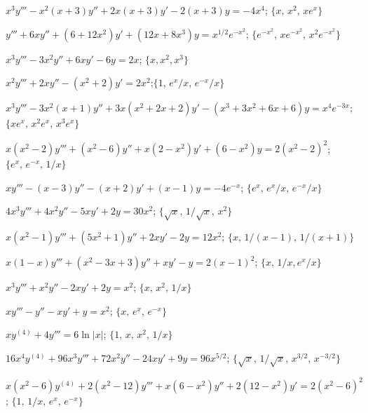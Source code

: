 \begin{exerciselist}
\item\label{exer:9.4.1}$x^3y'''-x^2(x+3)y''+2x(x+3)y'-2(x+3)y=-4x^4$;\quad
$\{x,\,x^2,\,xe^x\}$

\item\label{exer:9.4.2}$y'''+6xy''+(6+12x^2)y'+(12x+8x^3)y=x^{1/2}e^{-x^2}$;\quad
 $\{e^{-x^2},\,xe^{-x^2},\,x^2e^{-x^2}\}$

\item\label{exer:9.4.3}$x^3y'''-3x^2y''+6xy'-6y=2x$;
 \quad  $\{x,x^2,x^3\}$

\item\label{exer:9.4.4}$x^2y'''+2xy''-(x^2+2)y'=2x^2$;\quad   $\{1,\,e^x/x,\,e^{-x}/x\}$

\item\label{exer:9.4.5}$x^3y'''-3x^2(x+1)y''+3x(x^2+2x+2)y'-(x^3+3x^2+6x+6)y=x^4e^{-3x}$;\quad$\{xe^x,\,x^2e^x,\,x^3e^x\}$

\item\label{exer:9.4.6}$x(x^2-2)y'''+(x^2-6)y''+x(2-x^2)y'+(6-x^2)y=2(x^2-2)^2$; \quad
 $\{e^x,\,e^{-x},\,1/x\}$

\item\label{exer:9.4.7}$xy'''-(x-3)y''-(x+2)y'+(x-1)y=-4e^{-x}$; \quad
$\{e^x,\,e^x/x,\,e^{-x}/x\}$

\item\label{exer:9.4.8}$4x^3y'''+4x^2y''-5xy'+2y=30x^2$; \quad  $\{\sqrt x,\,1/\sqrt x,\,x^2\}$

\item\label{exer:9.4.9}$x(x^2-1)y'''+(5x^2+1)y''+2xy'-2y=12x^2$; \quad
$\{x,\,1/(x-1),\,1/(x+1)\}$

\item\label{exer:9.4.10}$x(1-x)y'''+(x^2-3x+3)y''+xy'-y=2(x-1)^2$; \quad
$\{x,\,1/x,e^x/x\}$

\item\label{exer:9.4.11}$x^3y'''+x^2y''-2xy'+2y=x^2$;  \quad  $\{x,\,x^2,\,1/x\}$

\item\label{exer:9.4.12}$xy'''-y''-xy'+y=x^2$; \quad
$\{x,\,e^x,\,e^{-x}\}$

\item\label{exer:9.4.13}$xy^{(4)}+4y'''=6 \ln |x|$; \quad   $\{1,\,x,\,x^2,\,1/x\}$

\item\label{exer:9.4.14}$16x^4y^{(4)}+96x^3y'''+72x^2y''-24xy'+9y=96x^{5/2}$; \quad
$\{\sqrt x,\,1/\sqrt x,\,x^{3/2},\,x^{-3/2}\}$

\item\label{exer:9.4.15}$x(x^2-6)y^{(4)}+2(x^2-12)y'''+x(6-x^2)y''+2(12-x^2)y'=2(x^2-6)^2$; \quad $\{1,\,1/x,\,e^x,\,e^{-x}\}$


\end{exerciselist}
